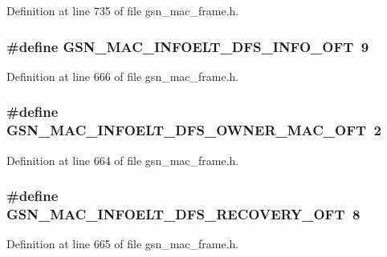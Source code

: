 Definition at line 735 of file gsn\_\-mac\_\-frame.h.

\hypertarget{a00523_a32c1d8ec4dfdf2b4a810d03073563719}{
\subsubsection[{GSN\_\-MAC\_\-INFOELT\_\-DFS\_\-INFO\_\-OFT}]{\setlength{\rightskip}{0pt plus 5cm}\#define GSN\_\-MAC\_\-INFOELT\_\-DFS\_\-INFO\_\-OFT~9}}
\label{a00523_a32c1d8ec4dfdf2b4a810d03073563719}


Definition at line 666 of file gsn\_\-mac\_\-frame.h.

\hypertarget{a00523_abd2b280f14dcd35d31b4f4fa7213b0f5}{
\subsubsection[{GSN\_\-MAC\_\-INFOELT\_\-DFS\_\-OWNER\_\-MAC\_\-OFT}]{\setlength{\rightskip}{0pt plus 5cm}\#define GSN\_\-MAC\_\-INFOELT\_\-DFS\_\-OWNER\_\-MAC\_\-OFT~2}}
\label{a00523_abd2b280f14dcd35d31b4f4fa7213b0f5}


Definition at line 664 of file gsn\_\-mac\_\-frame.h.

\hypertarget{a00523_af11fb3dffc2748002211efe86d5d0fde}{
\subsubsection[{GSN\_\-MAC\_\-INFOELT\_\-DFS\_\-RECOVERY\_\-OFT}]{\setlength{\rightskip}{0pt plus 5cm}\#define GSN\_\-MAC\_\-INFOELT\_\-DFS\_\-RECOVERY\_\-OFT~8}}
\label{a00523_af11fb3dffc2748002211efe86d5d0fde}


Definition at line 665 of file gsn\_\-mac\_\-frame.h.

